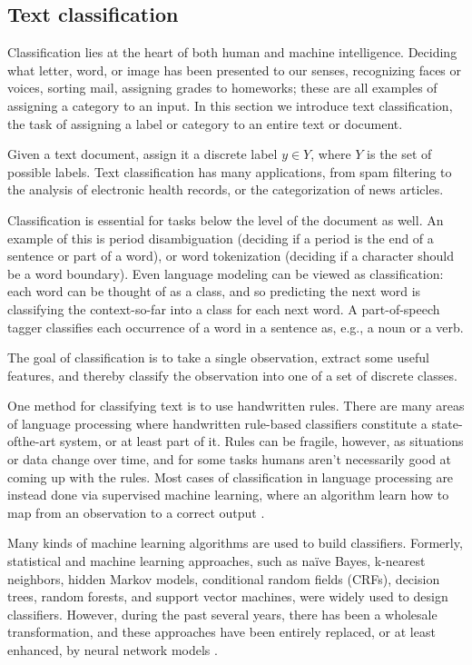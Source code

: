 \subsection{Text classification}\label{subsec:text-classification}

Classification lies at the heart of both human and machine intelligence. Deciding what letter, word, or image has been presented to our senses, recognizing faces or voices, sorting mail, assigning grades to homeworks; these are all examples of assigning a category to an input.
In this section we introduce text classification, the task of assigning a label or category to an entire text or document.

Given a text document, assign it a discrete label $y \in Y$, where $Y$ is the set of possible labels. 
Text classification has many applications, from spam filtering to the analysis of electronic health records, or the categorization of news articles.

Classification is essential for tasks below the level of the document as well.
An example of this is period disambiguation (deciding if a period is the end of a sentence or part of a word), or word tokenization (deciding if a character should be a word boundary). Even language modeling can be viewed as classification: each word can be thought of as a class, and so predicting the next word is classifying the context-so-far into a class for each next word. A part-of-speech tagger classifies each occurrence of a word in a sentence as, e.g., a noun or a verb.

The goal of classification is to take a single observation, extract some useful features, and thereby classify the observation into one of a set of discrete classes.

One method for classifying text is to use handwritten rules. There are many areas of language processing where handwritten rule-based classifiers constitute a state-ofthe-art system, or at least part of it. Rules can be fragile, however, as situations or data change over time, and for
some tasks humans aren't necessarily good at coming up with the rules. Most cases of classification in language processing are instead done via supervised machine learning, where an algorithm learn how to map from an observation to a correct output \cite{Jurafsky2009}.

Many kinds of machine learning algorithms are used to build classifiers.
Formerly, statistical and machine learning approaches, such as naïve Bayes, k-nearest neighbors, hidden Markov models, conditional random fields (CRFs), decision trees, random forests, and support vector machines, were widely used to design classifiers. 
However, during the past several years, there has been a wholesale transformation, and these approaches have been entirely replaced, or at least enhanced, by neural network models \cite{surveyNlpDeepLearning}. 


